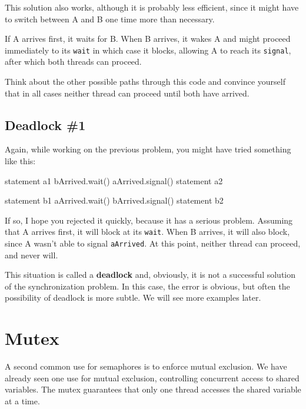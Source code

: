 \documentclass{book}
\begin{document}
This solution also works, although it is probably less
efficient, since it might have to switch between A and B
one time more than necessary.

If A arrives first, it waits for B.  When B arrives, it wakes
A and might proceed immediately to its {\tt wait} in which
case it blocks, allowing A to reach its {\tt signal}, after
which both threads can proceed.

Think about the other possible paths through this code and
convince yourself that in all cases neither thread can
proceed until both have arrived.

\subsection {Deadlock \#1}

Again, while working on the previous problem, you might have
tried something like this:
\begin{minipage}[t]{0.4\textwidth}
    \begin{unbreakable}[title={Thread A}]{}
statement a1
bArrived.wait()
aArrived.signal()
statement a2
\end{unbreakable}
\end{minipage}
\hfill
\begin{minipage}[t]{0.4\textwidth}
    \begin{unbreakable}[title={Thread B}]{}
statement b1
aArrived.wait()
bArrived.signal()
statement b2
\end{unbreakable}
\end{minipage}

If so, I hope you rejected it quickly, because it has a serious
problem.  Assuming that A arrives first, it will block at its
    {\tt wait}.  When B arrives, it will also block, since A wasn't
able to signal {\tt aArrived}.  At this point, neither thread
can proceed, and never will.

This situation is called a {\bf deadlock} and, obviously, it is
not a successful solution of the synchronization problem.  In
this case, the error is obvious, but often the possibility of
deadlock is more subtle.  We will see more examples later.


\section{Mutex}

A second common use for semaphores is to enforce mutual exclusion.
We have already seen one use for mutual exclusion, controlling
concurrent access to shared variables.  The mutex guarantees
that only one thread accesses the shared variable at a time.
\end{document}
